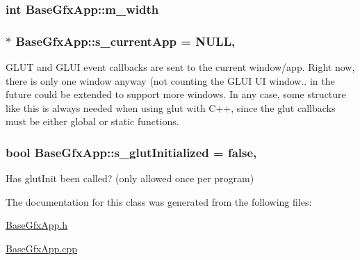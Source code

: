 \hypertarget{classBaseGfxApp_a7e5ef1c8f25fe081b4a1fd4ce6a96e07}{
\subsubsection[{m\-\_\-width}]{\setlength{\rightskip}{0pt plus 5cm}int Base\-Gfx\-App\-::m\-\_\-width\hspace{0.3cm}{\ttfamily [protected]}}}\label{classBaseGfxApp_a7e5ef1c8f25fe081b4a1fd4ce6a96e07}
\hypertarget{classBaseGfxApp_a65ba89b98af31e2649a0546631931000}{
\subsubsection[{s\-\_\-current\-App}]{ $\ast$ Base\-Gfx\-App\-::s\-\_\-current\-App = N\-U\-L\-L\hspace{0.3cm}{\ttfamily [static]}, {\ttfamily [protected]}}}\label{classBaseGfxApp_a65ba89b98af31e2649a0546631931000}
G\-L\-U\-T and G\-L\-U\-I event callbacks are sent to the current window/app. Right now, there is only one window anyway (not counting the G\-L\-U\-I U\-I window.. in the future could be extended to support more windows. In any case, some structure like this is always needed when using glut with C++, since the glut callbacks must be either global or static functions. \hypertarget{classBaseGfxApp_afa4690383ea27713016ef75b9fb1e42f}{
\subsubsection[{s\-\_\-glut\-Initialized}]{\setlength{\rightskip}{0pt plus 5cm}bool Base\-Gfx\-App\-::s\-\_\-glut\-Initialized = false\hspace{0.3cm}{\ttfamily [static]}, {\ttfamily [protected]}}}\label{classBaseGfxApp_afa4690383ea27713016ef75b9fb1e42f}
Has glut\-Init been called? (only allowed once per program) 

The documentation for this class was generated from the following files\-:\begin{DoxyCompactItemize}
\item 
\hyperlink{BaseGfxApp_8h}{Base\-Gfx\-App.\-h}\item 
\hyperlink{BaseGfxApp_8cpp}{Base\-Gfx\-App.\-cpp}\end{DoxyCompactItemize}
